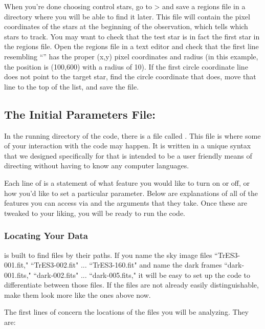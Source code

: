 \documentclass{article}
\begin{document}
When you're done choosing control stars, go to  \textgreater  {} and save a regions file in a directory where you will be able to find it later. This file will contain the pixel coordinates of the stars at the beginning of the observation, which tells \oscaar which stars to track. You may want to check that the test star is in fact the first star in the regions file. Open the regions file in a text editor and check that the first line resembling ``'' has the proper (x,y) pixel coordinates and radius (in this example, the position is (100,600) with a radius of 10). If the first circle coordinate line does not point to the target star, find the circle coordinate that does, move that line to the top of the list, and save the file.

\subsection{The Initial Parameters File: \init}

In the running directory of the code, there is a file called \init. This file is where some of your interaction with the code may happen. It is written in a unique syntax that we designed specifically for \oscaar that is intended to be a user friendly means of directing \oscaar without having to know any computer languages. 

Each line of \init is a statement of what feature you would like to turn on or off, or how you'd like to set a particular parameter. Below are explanations of all of the features you can access via \init and the arguments that they take. Once these are tweaked to your liking, you will be ready to run the code. 

\subsubsection{Locating Your Data}

	\oscaar  is built to find files by their paths. If you name the sky image files ``TrES3-001.fit," ``TrES3-002.fit" ... ``TrES3-160.fit" and name the dark frames ``dark-001.fits," ``dark-002.fits" ... ``dark-005.fits," it will be easy to set up the code to differentiate between those files. If the files are not already easily distinguishable, make them look more like the ones above now. 
	
	The first lines of  concern the locations of the files you will be analyzing. They are: \\ 
\end{document}
